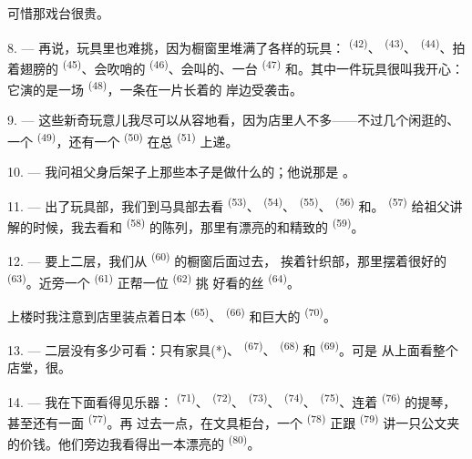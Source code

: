 可惜那戏台很贵。

8. --- 再说，玩具里也难挑，因为橱窗里堆满了各样的玩具：
\textsuperscript{(42)}、 \textsuperscript{(43)}、
\textsuperscript{(44)}、拍着翅膀的 \textsuperscript{(45)}、会吹哨的
 \textsuperscript{(46)}、会叫的、一台
\textsuperscript{(47)} 和。其中一件玩具很叫我开心：它演的是一场
 \textsuperscript{(48)}，一条在一片长着的
岸边受袭击。


9. --- 这些新奇玩意儿我尽可以从容地看，因为店里人不多——不过几个闲逛的、
一个 \textsuperscript{(49)}，还有一个 \textsuperscript{(50)}
在总 \textsuperscript{(51)} 上递。

10. --- 我问祖父身后架子上那些本子是做什么的；他说那是
。

\VUsaut{3.6mm}
\VUsaut{2.8mm}

11. --- 出了玩具部，我们到马具部去看 \textsuperscript{(53)}、
 \textsuperscript{(54)}、 \textsuperscript{(55)}、
 \textsuperscript{(56)} 和。
\textsuperscript{(57)} 给祖父讲解的时候，我去看和
\textsuperscript{(58)} 的陈列，那里有漂亮的和精致的
\textsuperscript{(59)}。

12. --- 要上二层，我们从 \textsuperscript{(60)} 的橱窗后面过去，
挨着针织部，那里摆着很好的 \textsuperscript{(63)}。近旁一个
 \textsuperscript{(61)} 正帮一位 \textsuperscript{(62)} 挑
好看的丝 \textsuperscript{(64)}。

上楼时我注意到店里装点着日本 \textsuperscript{(65)}、
\textsuperscript{(66)} 和巨大的 \textsuperscript{(70)}。

13. --- 二层没有多少可看：只有家具(*)、 \textsuperscript{(67)}、
 \textsuperscript{(68)} 和 \textsuperscript{(69)}。可是
从上面看整个店堂，很。

14. --- 我在下面看得见乐器： \textsuperscript{(71)}、
\textsuperscript{(72)}、 \textsuperscript{(73)}、
\textsuperscript{(74)}、 \textsuperscript{(75)}、连着
\textsuperscript{(76)} 的提琴，甚至还有一面 \textsuperscript{(77)}。再
过去一点，在文具柜台，一个 \textsuperscript{(78)} 正跟
\textsuperscript{(79)} 讲一只公文夹的价钱。他们旁边我看得出一本漂亮的
 \textsuperscript{(80)}。

